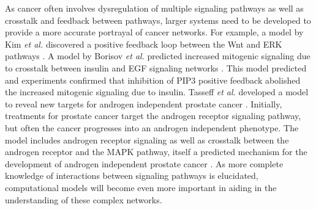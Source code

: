 \documentclass[12pt]{article}
\begin{document}
As cancer often involves dysregulation of multiple signaling pathways as well as crosstalk and feedback between pathways, larger systems need to be developed to provide a more accurate portrayal of cancer networks. For example, a model by Kim \textit{et al.} discovered a positive feedback loop between the Wnt and ERK pathways \cite{Kim2007}. A model by Borisov \textit{et al.} predicted increased mitogenic signaling due to crosstalk between insulin and EGF signaling networks \cite{Borisov2009}. This model predicted and experiments confirmed that inhibition of PIP3 positive feedback abolished the increased mitogenic signaling due to insulin. Tasseff \textit{et al.} developed a model to reveal new targets for androgen independent prostate cancer \cite{Tasseff2010}. Initially, treatments for prostate cancer target the androgen receptor signaling pathway, but often the cancer progresses into an androgen independent phenotype. The model includes androgen receptor signaling as well as crosstalk between the androgen receptor and the MAPK pathway, itself a predicted mechanism for the development of androgen independent prostate cancer \cite{Feldman2001}. As more complete knowledge of interactions between signaling pathways is elucidated, computational models will become even more important in aiding in the understanding of these complex networks.
\end{document}
